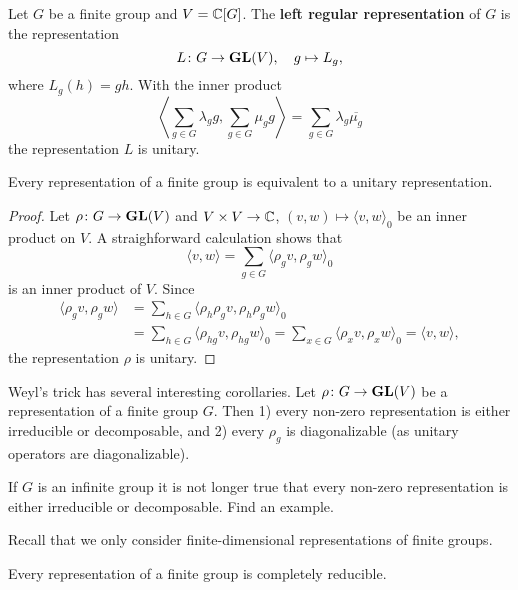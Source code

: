 \begin{example}
Let $G$ be a finite group and $V=\mathbb{C}[G]$. The \textbf{left regular representation}
of $G$ is the representation
\[
L\colon G\to\mathbf{GL}(V),
\quad
g\mapsto L_g,
\]
where $L_g(h)=gh$. With the inner product
\[
\left\langle\sum_{g\in G}\lambda_gg,\sum_{g\in G}\mu_gg\right\rangle=\sum_{g\in G}\lambda_g\overline{\mu_g}
\]
the representation $L$ is unitary.
\end{example}

\begin{proposition}
    Every representation of a finite group is equivalent to a unitary representation.
\end{proposition}

\begin{proof}
    Let $\rho\colon G\to\mathbf{GL}(V)$ and $V\times V\to\mathbb{C}$, $(v,w)\mapsto\langle v,w\rangle_0$ be an inner
    product on $V$. A straighforward calculation shows that
    \[
    \langle v,w\rangle=\sum_{g\in G}\langle\rho_gv,\rho_gw\rangle_0
    \]
    is an inner product of $V$. Since
    \begin{align*}
    \langle\rho_gv,\rho_gw\rangle&=\sum_{h\in G}\langle\rho_h\rho_gv,\rho_h\rho_gw\rangle_0\\
    &=\sum_{h\in G}\langle\rho_{hg}v,\rho_{hg}w\rangle_0=\sum_{x\in G}\langle\rho_xv,\rho_xw\rangle_0=\langle v,w\rangle,
    \end{align*}
    the representation $\rho$ is unitary.
\end{proof}

\label{rho_diagonalizable}
Weyl's trick has several interesting corollaries. Let $\rho\colon G\to\mathbf{GL}(V)$ be a representation
of a finite group $G$. Then 1) every non-zero representation is either
irreducible or decomposable, and 2) every $\rho_g$ is diagonalizable
(as unitary operators are diagonalizable).

\begin{exercise}
    If $G$ is an infinite group it is not longer true that every non-zero representation
    is either irreducible or decomposable. Find an example.
\end{exercise}

Recall that we only consider finite-dimensional representations of finite groups.

\begin{theorem}[Maschke]
    Every representation of a finite group is completely reducible.
\end{theorem}

